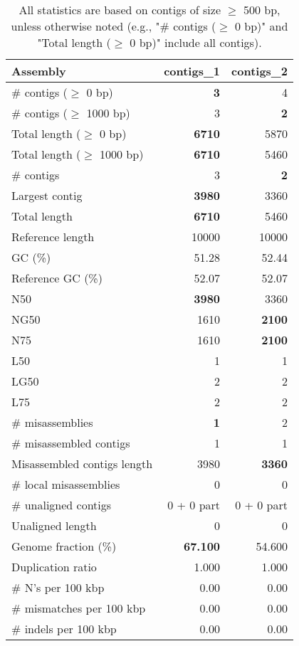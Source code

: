 \documentclass[12pt,a4paper]{article}
\begin{document}
\begin{table}[ht]
\begin{center}
\caption{All statistics are based on contigs of size $\geq$ 500 bp, unless otherwise noted (e.g., "\# contigs ($\geq$ 0 bp)" and "Total length ($\geq$ 0 bp)" include all contigs).}
\begin{tabular}{|l*{2}{|r}|}
\hline
Assembly & contigs\_1 & contigs\_2 \\ \hline
\# contigs ($\geq$ 0 bp) & {\bf 3} & 4 \\ \hline
\# contigs ($\geq$ 1000 bp) & 3 & {\bf 2} \\ \hline
Total length ($\geq$ 0 bp) & {\bf 6710} & 5870 \\ \hline
Total length ($\geq$ 1000 bp) & {\bf 6710} & 5460 \\ \hline
\# contigs & 3 & {\bf 2} \\ \hline
Largest contig & {\bf 3980} & 3360 \\ \hline
Total length & {\bf 6710} & 5460 \\ \hline
Reference length & 10000 & 10000 \\ \hline
GC (\%) & 51.28 & 52.44 \\ \hline
Reference GC (\%) & 52.07 & 52.07 \\ \hline
N50 & {\bf 3980} & 3360 \\ \hline
NG50 & 1610 & {\bf 2100} \\ \hline
N75 & 1610 & {\bf 2100} \\ \hline
L50 & 1 & 1 \\ \hline
LG50 & 2 & 2 \\ \hline
L75 & 2 & 2 \\ \hline
\# misassemblies & {\bf 1} & 2 \\ \hline
\# misassembled contigs & 1 & 1 \\ \hline
Misassembled contigs length & 3980 & {\bf 3360} \\ \hline
\# local misassemblies & 0 & 0 \\ \hline
\# unaligned contigs & 0 + 0 part & 0 + 0 part \\ \hline
Unaligned length & 0 & 0 \\ \hline
Genome fraction (\%) & {\bf 67.100} & 54.600 \\ \hline
Duplication ratio & 1.000 & 1.000 \\ \hline
\# N's per 100 kbp & 0.00 & 0.00 \\ \hline
\# mismatches per 100 kbp & 0.00 & 0.00 \\ \hline
\# indels per 100 kbp & 0.00 & 0.00 \\ \hline

\end{tabular}
\end{center}
\end{table}
\end{document}

